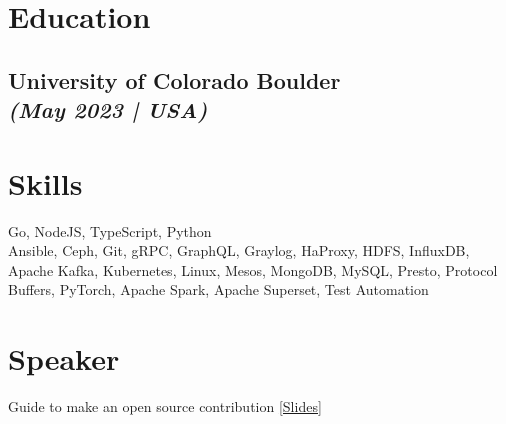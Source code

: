 \documentclass[]{deedy-resume-openfont}
\begin{document}
%
%
\lastupdated

%
%
%
%

\begin{minipage}[t]{0.33\textwidth} 

\sectionsep
\section{Education} 

\subsection{University of Colorado Boulder \\ {\footnotesize \textit{\textbf{(May 2023 | USA) }}}}

\sectionsep


\section{Skills}
Go, NodeJS, TypeScript, Python \\
\vspace{1em}
Ansible, Ceph, Git, gRPC, GraphQL, Graylog, HaProxy, HDFS, InfluxDB, Apache Kafka, Kubernetes, Linux, Mesos, MongoDB, MySQL, Presto, Protocol Buffers, PyTorch, Apache Spark, Apache Superset, Test Automation \\
\sectionsep

\section{Speaker}
Guide to make an open source contribution \href{https://tushar-rishav.github.io/EPGit/}{[Slides]}
\sectionsep


\end{minipage}
\end{document}
